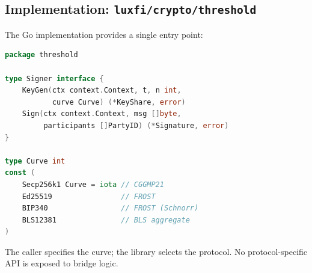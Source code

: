 \subsection{Implementation: \texttt{luxfi/crypto/threshold}}

The Go implementation provides a single entry point:

\begin{lstlisting}[language=Go,caption={Threshold signing entry point}]
package threshold

type Signer interface {
    KeyGen(ctx context.Context, t, n int,
           curve Curve) (*KeyShare, error)
    Sign(ctx context.Context, msg []byte,
         participants []PartyID) (*Signature, error)
}

type Curve int
const (
    Secp256k1 Curve = iota // CGGMP21
    Ed25519                // FROST
    BIP340                 // FROST (Schnorr)
    BLS12381               // BLS aggregate
)
\end{lstlisting}

The caller specifies the curve; the library selects the protocol. No protocol-specific API is exposed to bridge logic.

